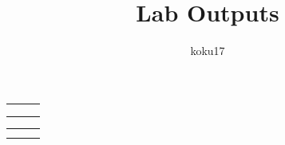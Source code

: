 \documentclass{article}
\title{Lab Outputs}
\author{koku17}
\begin{document}
	\maketitle {} \newpage
	\begin{landscape}
	\begin{table}
		\centering
		\begin{tabular}{lll}
			 &
			 &
			 \\
			 &
			 &
			 \\
			 &
			 &
			
		\end{tabular}
	\end{table}

	\begin{table}
		\centering
		\begin{tabular}{lll}
			 &
			 &
			 \\
			 &
			 &
			 \\
			
		\end{tabular}
	\end{table}
	\end{landscape}
\end{document}
